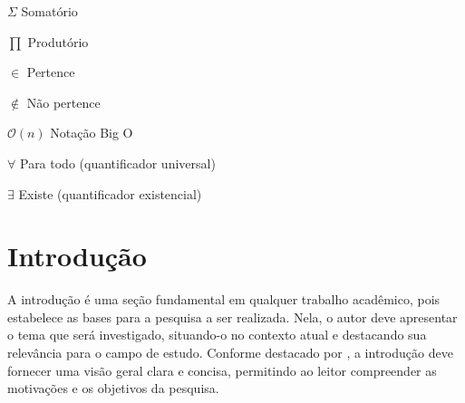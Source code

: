 \documentclass[
    12pt
    ,oneside
    ,a4paper
    ,chapter=TITLE
    ,section=TITLE
    ,sumario=abnt-6027-2012]{abntex2}
\begin{document}
\begin{simbolos}
    \item[$ \Sigma $]   Somatório
    \item[$ \prod $]    Produtório
    \item[$ \in $]      Pertence 
    \item[$ \notin $]   Não pertence
    \item[$ \mathcal{O}(n) $] Notação Big O 
    \item[$ \forall $]  Para todo (quantificador universal)
    \item[$ \exists $]  Existe (quantificador existencial)
\end{simbolos}

\sumario


\textual

\chapter{Introdução}
\label{cap:introducao}

A introdução é uma seção fundamental em qualquer trabalho acadêmico, pois estabelece as bases para a pesquisa a ser realizada. Nela, o autor deve apresentar o tema que será investigado, situando-o no contexto atual e destacando sua relevância para o campo de estudo. Conforme destacado por , a introdução deve fornecer uma visão geral clara e concisa, permitindo ao leitor compreender as motivações e os objetivos da pesquisa.
\end{document}

